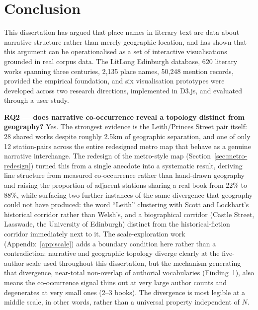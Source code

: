 \documentclass[logo,msc]{infthesis}
\begin{document}
 
\chapter{Conclusion}
\label{chap:conclusion}
 
This dissertation has argued that place names in literary text are data about narrative structure rather than merely geographic location, and has shown that this argument can be operationalised as a set of interactive visualisations grounded in real corpus data. The LitLong Edinburgh database, 620 literary works spanning three centuries, 2,135 place names, 50,248 mention records, provided the empirical foundation, and six visualisation prototypes were developed across two research directions, implemented in D3.js, and evaluated through a user study.

\textbf{RQ2 --- does narrative co-occurrence reveal a topology distinct from geography?} Yes. The strongest evidence is the Leith/Princes Street pair itself: 28 shared works despite roughly 2.5km of geographic separation, and one of only 12 station-pairs across the entire redesigned metro map that behave as a genuine narrative interchange. The redesign of the metro-style map (Section~\ref{sec:metro-redesign}) turned this from a single anecdote into a systematic result, deriving line structure from measured co-occurrence rather than hand-drawn geography and raising the proportion of adjacent stations sharing a real book from 22\% to 88\%, while surfacing two further instances of the same divergence that geography could not have produced: the word ``Leith'' clustering with Scott and Lockhart's historical corridor rather than Welsh's, and a biographical corridor (Castle Street, Lasswade, the University of Edinburgh) distinct from the historical-fiction corridor immediately next to it. The scale-exploration work (Appendix~\ref{app:scale}) adds a boundary condition here rather than a contradiction: narrative and geographic topology diverge clearly at the five-author scale used throughout this dissertation, but the mechanism generating that divergence, near-total non-overlap of authorial vocabularies (Finding~1), also means the co-occurrence signal thins out at very large author counts and degenerates at very small ones (2--3 books). The divergence is most legible at a middle scale, in other words, rather than a universal property independent of $N$.
\end{document}
